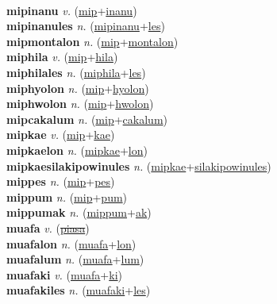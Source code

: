  \label{mipak} \\
\textbf{mipinanu} \textit{v.} (\hyperref[mip]{mip}+\hyperref[inanu]{inanu})
 \label{mipinanu} \\
\textbf{mipinanules} \textit{n.} (\hyperref[mipinanu]{mipinanu}+\hyperref[les]{les})
 \label{mipinanules} \\
\textbf{mipmontalon} \textit{n.} (\hyperref[mip]{mip}+\hyperref[montalon]{montalon})
 \label{mipmontalon} \\
\textbf{miphila} \textit{v.} (\hyperref[mip]{mip}+\hyperref[hila]{hila})
 \label{miphila} \\
\textbf{miphilales} \textit{n.} (\hyperref[miphila]{miphila}+\hyperref[les]{les})
 \label{miphilales} \\
\textbf{miphyolon} \textit{n.} (\hyperref[mip]{mip}+\hyperref[hyolon]{hyolon})
 \label{miphyolon} \\
\textbf{miphwolon} \textit{n.} (\hyperref[mip]{mip}+\hyperref[hwolon]{hwolon})
 \label{miphwolon} \\
\textbf{mipcakalum} \textit{n.} (\hyperref[mip]{mip}+\hyperref[cakalum]{cakalum})
 \label{mipcakalum} \\
\textbf{mipkae} \textit{v.} (\hyperref[mip]{mip}+\hyperref[kae]{kae})
 \label{mipkae} \\
\textbf{mipkaelon} \textit{n.} (\hyperref[mipkae]{mipkae}+\hyperref[lon]{lon})
 \label{mipkaelon} \\
\textbf{mipkaesilakipowinules} \textit{n.} (\hyperref[mipkae]{mipkae}+\hyperref[silakipowinules]{silakipowinules})
 \label{mipkaesilakipowinules} \\
\textbf{mippes} \textit{n.} (\hyperref[mip]{mip}+\hyperref[pes]{pes})
 \label{mippes} \\
\textbf{mippum} \textit{n.} (\hyperref[mip]{mip}+\hyperref[pum]{pum})
 \label{mippum} \\
\textbf{mippumak} \textit{n.} (\hyperref[mippum]{mippum}+\hyperref[ak]{ak})
 \label{mippumak} \\
\textbf{muafa} \textit{v.} (\hyperref[piasa]{\sout{piasa}})
 \label{muafa} \\
\textbf{muafalon} \textit{n.} (\hyperref[muafa]{muafa}+\hyperref[lon]{lon})
 \label{muafalon} \\
\textbf{muafalum} \textit{n.} (\hyperref[muafa]{muafa}+\hyperref[lum]{lum})
 \label{muafalum} \\
\textbf{muafaki} \textit{v.} (\hyperref[muafa]{muafa}+\hyperref[ki]{ki})
 \label{muafaki} \\
\textbf{muafakiles} \textit{n.} (\hyperref[muafaki]{muafaki}+\hyperref[les]{les})
